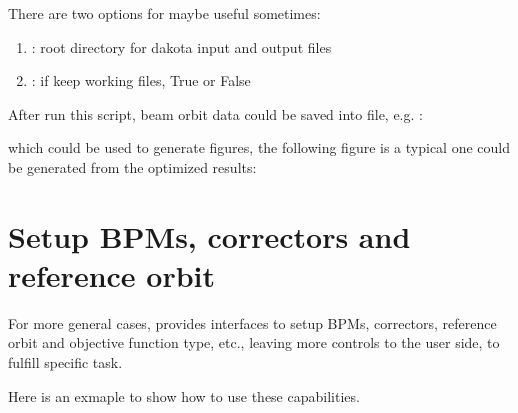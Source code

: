 \documentclass[letterpaper,10pt,english]{sphinxmanual}
\begin{document}
There are two options for  maybe useful sometimes:
\begin{enumerate}
\item {} 
: root directory for dakota input and output files

\item {} 
: if keep working files, True or False

\end{enumerate}

After run this script, beam orbit data could be saved into file, e.g.
:

which could be used to generate figures, the following figure is a typical
one could be generated from the optimized results:



\section{Setup BPMs, correctors and reference orbit}
\label{src/demos/demo2:setup-bpms-correctors-and-reference-orbit}\label{src/demos/demo2::doc}
For more general cases,  provides interfaces to setup
BPMs, correctors, reference orbit and objective function type, etc.,
leaving more controls to the user side, to fulfill specific task.

Here is an exmaple to show how to use these capabilities.
\end{document}
